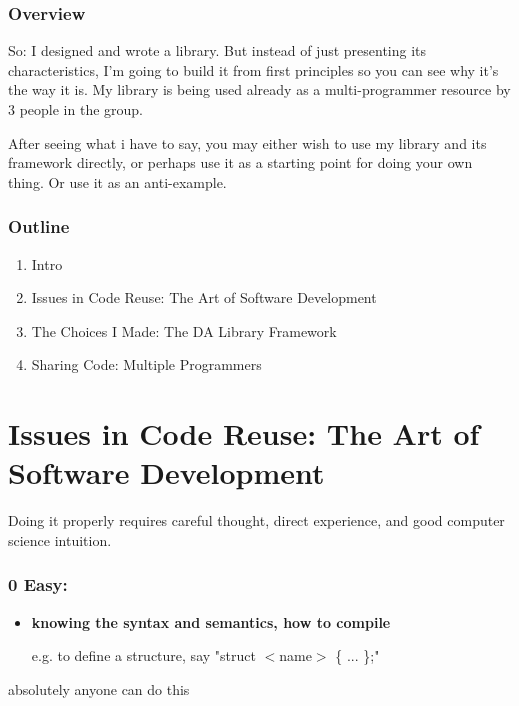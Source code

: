 \section*{Overview}
So: I designed and wrote a library.  But instead of just presenting its
characteristics, I'm going to build it from first principles so you can see
why it's the way it is. My library is being used already as a multi-programmer 
resource by 3 people in the group.

After seeing what i have to say, you may either wish to use my library and
its framework directly, or perhaps use it as a starting point for doing your
own thing.  Or use it as an anti-example.

\section*{Outline}
\begin{enumerate}
\item Intro
\item Issues in Code Reuse:  The Art of Software Development
\item The Choices I Made:  The DA Library Framework
\item Sharing Code: Multiple Programmers
\end{enumerate}

\pagebreak
\part{Issues in Code Reuse: The Art of Software Development}

Doing it properly requires careful thought, direct experience, and good
computer science intuition.

\section*{0  Easy:}
\begin{itemize}
\item {\bf knowing the syntax and semantics, how to compile}

	e.g. to define a structure, say "struct $<$name$>$ \{ ... \};"
\end{itemize}

absolutely anyone can do this

\pagebreak
